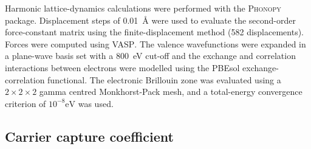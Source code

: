 Harmonic lattice-dynamics calculations were performed with the \textsc{Phonopy} package.\autocite{Togo2015}
Displacement steps of \SI{0.01}{\angstrom} were used to evaluate the second-order force-constant matrix using the finite-displacement method (582 displacements).
Forces were computed using \textsc{VASP}.
The valence wavefunctions were expanded in a plane-wave basis set with a \SI{800}{\electronvolt} cut-off and the exchange and correlation interactions between electrons were modelled using the PBEsol exchange-correlation functional.\autocite{Perdew2008a}
The electronic Brillouin zone was evaluated using a $2\! \times\! 2\! \times\! 2$ gamma centred Monkhorst-Pack mesh, and a total-energy convergence criterion of $10^{-8}\textrm{eV}$ was used.

\subsection{Carrier capture coefficient}

